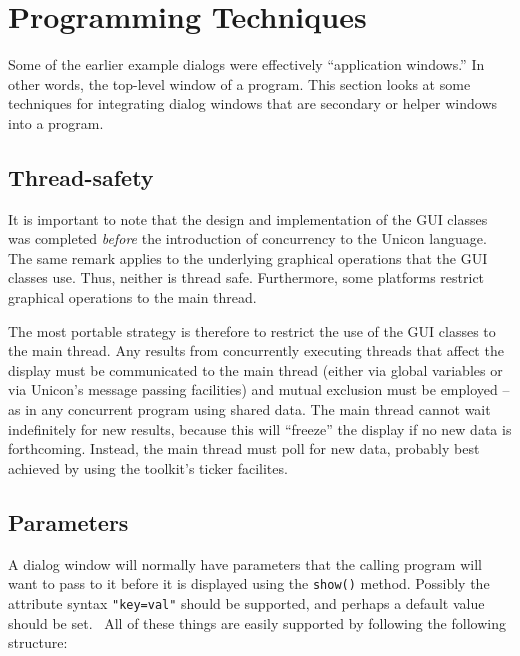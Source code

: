 \section{Programming Techniques}

Some of the earlier example dialogs were effectively
``application windows.'' In other words, the
top-level window of a program. This section looks at some techniques
for integrating dialog windows that are secondary or helper windows
into a program.

\subsection*{Thread-safety}
It is important to note that the design and implementation of the GUI classes was
completed {\em before }the introduction of concurrency to the Unicon language.
The same remark applies to the underlying graphical operations that the GUI classes
use. Thus, neither is thread safe. Furthermore, some platforms restrict graphical
operations to the main thread.

The most portable strategy is therefore to restrict the use of the GUI classes to the main
thread. Any results from concurrently executing threads that affect the display must be
communicated to the main thread (either via global variables or via Unicon's message
passing facilities) and mutual exclusion must be employed -- as in any concurrent program
using shared data. The main thread cannot wait indefinitely for new results, because this
will ``freeze'' the display if no new data is forthcoming. Instead, the main thread must
poll for new data, probably best achieved by using the toolkit's ticker facilites.

\subsection*{Parameters}

A dialog window will normally have parameters that the calling program will want
to pass to it before it is displayed using the \texttt{show()} method. Possibly
the attribute syntax \texttt{"key=val"} should be
supported, and perhaps a default value should be set. \ All of these things are
easily supported by following the following structure:

